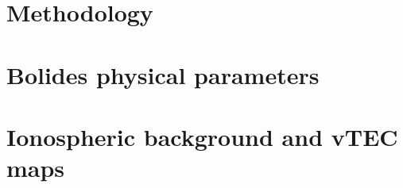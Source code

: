 \documentclass[times,twocolumn,final,authoryear]{elsarticle}
\begin{document}






\section{Methodology}
\label{sec:methodology}


\section{Bolides physical parameters}
\label{sec:bolides}

\section{Ionospheric background and vTEC maps}
\label{sec:vTEC-maps}
     
     
     
     
     
\end{document}
